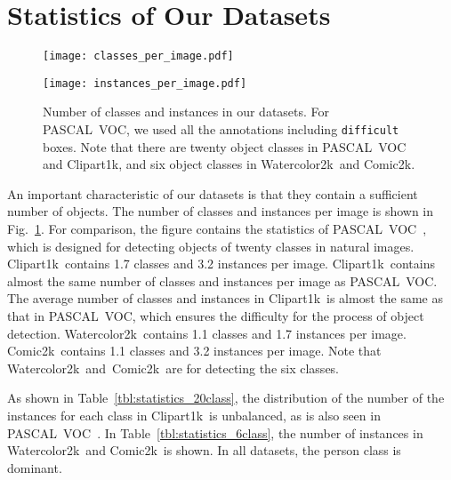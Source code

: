\documentclass[10pt,twocolumn,letterpaper]{article}
\newcommand{\Tref}[1]{Table~\ref{#1}}
\newcommand{\Fref}[1]{Fig.~\ref{#1}}
\newcommand{\datasetclipart}{Clipart1k}
\newcommand{\datasetwatercolor}{Watercolor2k}
\newcommand{\datasetcomic}{Comic2k}
\begin{document}
\section{Statistics of Our Datasets}
\begin{figure}[t]
\begin{minipage}[t]{\hsize}
  	  \centering
  	  \texttt{[image: classes\_per\_image.pdf]}
\end{minipage}
\begin{minipage}[t]{\hsize}
	\centering
  	\texttt{[image: instances\_per\_image.pdf]}
\end{minipage}
  \caption{Number of classes and instances in our datasets. For PASCAL~VOC, we used all the annotations including \texttt{difficult} boxes. Note that 
there are twenty object classes in PASCAL~VOC and \datasetclipart, and six object classes in \datasetwatercolor~and \datasetcomic.}
\label{fig:classes_and_instances_per_image}
\end{figure}
An important characteristic of our datasets is that they contain a sufficient number of objects.
The number of classes and instances per image is shown in \Fref{fig:classes_and_instances_per_image}.
For comparison, the figure contains the statistics of PASCAL~VOC~\cite{everingham2010pascal}, which is designed for detecting objects of twenty classes in natural images.
\datasetclipart~contains 1.7 classes and 3.2 instances per image.
\datasetclipart~contains almost the same number of classes and instances per image as PASCAL~VOC. 
The average number of classes and instances in \datasetclipart~is almost the same as that in PASCAL~VOC, which ensures the difficulty for the process of object detection.
\datasetwatercolor~contains 1.1 classes and 1.7 instances per image.
\datasetcomic~contains 1.1 classes and 3.2 instances per image.
Note that \datasetwatercolor~and~\datasetcomic~are for detecting the six classes.

As shown in \Tref{tbl:statistics_20class}, the distribution of the number of the instances for each class in \datasetclipart~is unbalanced, as is also seen in PASCAL~VOC~\cite{everingham2010pascal}.
In \Tref{tbl:statistics_6class}, the number of instances in \datasetwatercolor~and \datasetcomic~is shown.
In all datasets, the person class is dominant.
\end{document}
